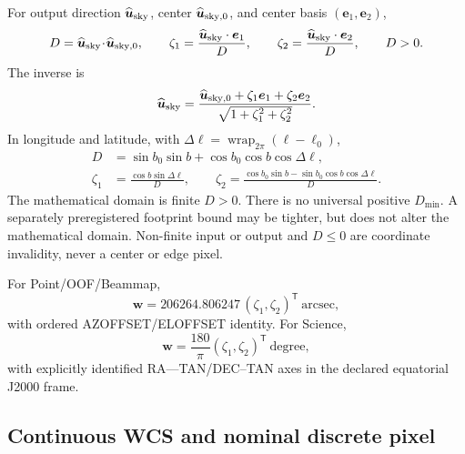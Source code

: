 For output direction $\widehat{\boldsymbol u}_{\rm sky}$, center
$\widehat{\boldsymbol u}_{\rm sky,0}$, and center
basis $(\boldsymbol e_1,\boldsymbol e_2)$,
\begin{equation}
 D=\widehat{\boldsymbol u}_{\rm sky}\!\cdot\!
   \widehat{\boldsymbol u}_{\rm sky,0},\qquad
 \zeta_1=\frac{\widehat{\boldsymbol u}_{\rm sky}\cdot\boldsymbol e_1}{D},
 \qquad
 \zeta_2=\frac{\widehat{\boldsymbol u}_{\rm sky}\cdot\boldsymbol e_2}{D},
 \qquad D>0.
 \label{eq:tan-forward}
\end{equation}
The inverse is
\begin{equation}
 \widehat{\boldsymbol u}_{\rm sky}=
 \frac{\widehat{\boldsymbol u}_{\rm sky,0}
       +\zeta_1\boldsymbol e_1+\zeta_2\boldsymbol e_2}
      {\sqrt{1+\zeta_1^2+\zeta_2^2}}.
 \label{eq:tan-inverse}
\end{equation}
In longitude and latitude, with
$\Delta\ell=\operatorname{wrap}_{2\pi}(\ell-\ell_0)$,
\begin{align}
 D&=\sin b_0\sin b+\cos b_0\cos b\cos\Delta\ell,\nonumber\\
 \zeta_1&=\frac{\cos b\sin\Delta\ell}{D},\qquad
 \zeta_2=\frac{\cos b_0\sin b-
          \sin b_0\cos b\cos\Delta\ell}{D}.
 \label{eq:tan-lonlat}
\end{align}
The mathematical domain is finite $D>0$.  There is no universal positive
$D_{\min}$.  A separately preregistered footprint bound may be tighter, but
does not alter the mathematical domain.  Non-finite input or output and
$D\leq0$ are coordinate invalidity, never a center or edge pixel.

For Point/OOF/Beammap,
\begin{equation}
 \boldsymbol w=206264.806247\,(\zeta_1,\zeta_2)^\mathsf T\ \text{arcsec},
 \label{eq:altaz-plane}
\end{equation}
with ordered AZOFFSET/ELOFFSET identity.  For Science,
\begin{equation}
 \boldsymbol w=\frac{180}{\pi}(\zeta_1,\zeta_2)^\mathsf T\ \text{degree},
 \label{eq:science-plane}
\end{equation}
with explicitly identified RA---TAN/DEC--TAN axes in the declared equatorial
J2000 frame.

\subsection{Continuous WCS and nominal discrete pixel}

